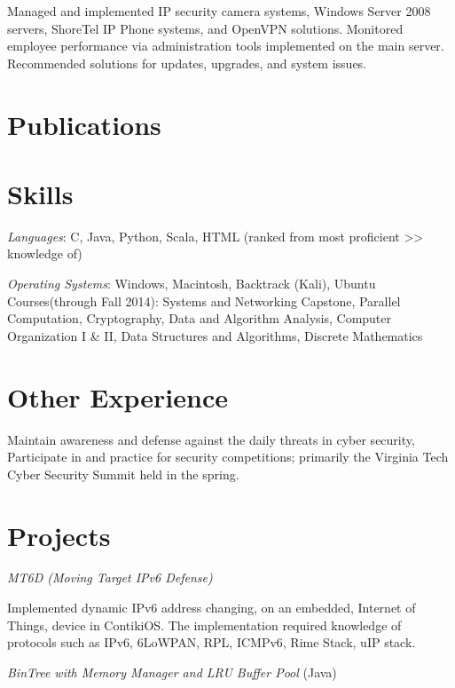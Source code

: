 \documentclass{tpreiss_cv}
\begin{document}
Managed and implemented IP security camera systems, Windows Server 2008 servers, ShoreTel IP Phone systems, and OpenVPN solutions. Monitored employee performance via administration tools implemented on    the main server. Recommended solutions for updates, upgrades, and system issues.

\section{Publications}

\section{Skills}
\textit{Languages}: C, Java, Python, Scala, HTML (ranked from most proficient >> knowledge of)

\textit{Operating Systems}: Windows, Macintosh, Backtrack (Kali), Ubuntu
Courses(through Fall 2014):    Systems and Networking Capstone, Parallel Computation, Cryptography, Data and Algorithm Analysis, Computer Organization I \& II, Data Structures and Algorithms, Discrete Mathematics

\section{Other Experience} 
Maintain awareness and defense against the daily threats in cyber security, Participate in and practice for security competitions; primarily the Virginia Tech Cyber Security Summit held in the spring.

\section{Projects}


\textit{MT6D (Moving Target IPv6 Defense)}

Implemented dynamic IPv6 address changing, on an embedded, Internet of Things, device in ContikiOS. The implementation required knowledge of protocols such as IPv6, 6LoWPAN, RPL, ICMPv6, Rime Stack, uIP stack.

\textit{BinTree with Memory Manager and LRU Buffer Pool} (Java)
\end{document}
